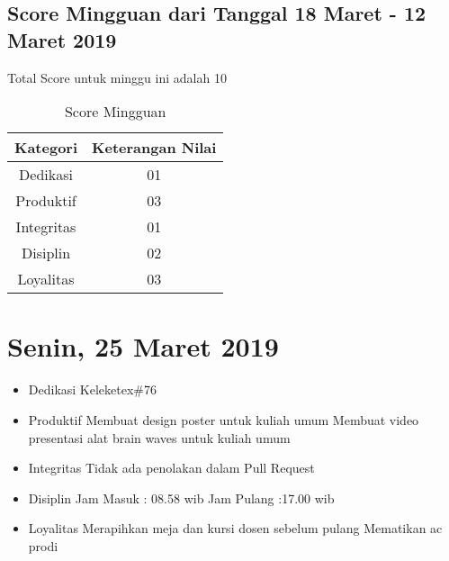 \subsection{Score Mingguan dari Tanggal 18 Maret - 12 Maret 2019}
Total Score untuk minggu ini adalah 10

\begin{table}[h]
\caption{Score Mingguan}
\centering
\begin{tabular}{|c|c|}
\hline
\textbf{Kategori}&\textbf{Keterangan Nilai}\\
\hline
Dedikasi&01\\
\hline
Produktif&03\\
\hline
Integritas&01\\
\hline
Disiplin&02\\
\hline
Loyalitas&03\\
\hline
\end{tabular}
\label{table:score mingguan}
\end{table}

\section{Senin, 25 Maret 2019}
\begin{itemize}
\item Dedikasi
\subitem Keleketex\#76
\item Produktif
  \subitem Membuat design poster untuk kuliah umum
  \subitem Membuat video presentasi alat brain waves untuk kuliah umum
\item Integritas
  \subitem Tidak ada penolakan dalam Pull Request
\item Disiplin
  \subitem Jam Masuk : 08.58 wib
  \subitem Jam Pulang :17.00 wib
\item Loyalitas
  \subitem Merapihkan meja dan kursi dosen sebelum pulang
  \subitem Mematikan ac prodi
\end{itemize}